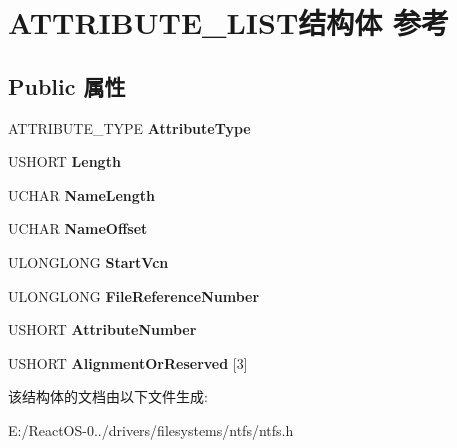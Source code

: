 \hypertarget{struct_a_t_t_r_i_b_u_t_e___l_i_s_t}{}\section{A\+T\+T\+R\+I\+B\+U\+T\+E\+\_\+\+L\+I\+S\+T结构体 参考}
\label{struct_a_t_t_r_i_b_u_t_e___l_i_s_t}
\subsection*{Public 属性}
\begin{DoxyCompactItemize}
\item 
\mbox{\label{struct_a_t_t_r_i_b_u_t_e___l_i_s_t_a5db1c28cc20a40d176e216fee06c9d4d}} 
A\+T\+T\+R\+I\+B\+U\+T\+E\+\_\+\+T\+Y\+PE {\bfseries Attribute\+Type}
\item 
\mbox{\label{struct_a_t_t_r_i_b_u_t_e___l_i_s_t_a755d79ab6d09df13a98259798f65c510}} 
U\+S\+H\+O\+RT {\bfseries Length}
\item 
\mbox{\label{struct_a_t_t_r_i_b_u_t_e___l_i_s_t_a50b0e0e6937abb8ace481cee150af59b}} 
U\+C\+H\+AR {\bfseries Name\+Length}
\item 
\mbox{\label{struct_a_t_t_r_i_b_u_t_e___l_i_s_t_ab335a9579a33185f13ecd363ead1c93b}} 
U\+C\+H\+AR {\bfseries Name\+Offset}
\item 
\mbox{\label{struct_a_t_t_r_i_b_u_t_e___l_i_s_t_a1d399b83bfa79be9187e6e3e4426b5df}} 
U\+L\+O\+N\+G\+L\+O\+NG {\bfseries Start\+Vcn}
\item 
\mbox{\label{struct_a_t_t_r_i_b_u_t_e___l_i_s_t_a63018e99b609b28f895c91d74e236ff2}} 
U\+L\+O\+N\+G\+L\+O\+NG {\bfseries File\+Reference\+Number}
\item 
\mbox{\label{struct_a_t_t_r_i_b_u_t_e___l_i_s_t_ac5aaeb24988d4a7047d8fd482d0275bb}} 
U\+S\+H\+O\+RT {\bfseries Attribute\+Number}
\item 
\mbox{\label{struct_a_t_t_r_i_b_u_t_e___l_i_s_t_aca424de5a5fce84c41d47be4519559f6}} 
U\+S\+H\+O\+RT {\bfseries Alignment\+Or\+Reserved} \mbox{[}3\mbox{]}
\end{DoxyCompactItemize}


该结构体的文档由以下文件生成\+:\begin{DoxyCompactItemize}
\item 
E\+:/\+React\+O\+S-\/0../drivers/filesystems/ntfs/ntfs.\+h\end{DoxyCompactItemize}
